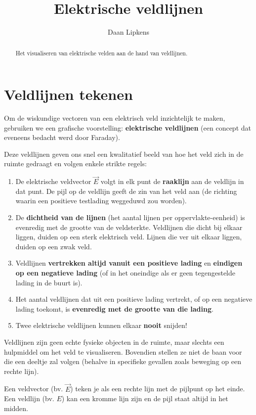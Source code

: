 \documentclass{ximera}
\title{Elektrische veldlijnen}
\author{Daan Lipkens}
\begin{document}
\begin{abstract}
    Het visualiseren van elektrische velden aan de hand van veldlijnen.
\end{abstract}
\maketitle

\section{Veldlijnen tekenen}

Om de wiskundige vectoren van een elektrisch veld inzichtelijk te maken, gebruiken we een grafische voorstelling: \textbf{elektrische veldlijnen} (een concept dat eveneens bedacht werd door Faraday).

Deze veldlijnen geven ons snel een kwalitatief beeld van hoe het veld zich in de ruimte gedraagt en volgen enkele strikte regels:

\begin{proposition}[foldable=true,title={Regels voor elektrische veldlijnen}]\nl
    \begin{enumerate}
        \item De elektrische veldvector $\vec{E}$ volgt in elk punt de \textbf{raaklijn} aan de veldlijn in dat punt. De pijl op de veldlijn geeft de zin van het veld aan (de richting waarin een positieve testlading weggeduwd zou worden).
        \item De \textbf{dichtheid van de lijnen} (het aantal lijnen per oppervlakte-eenheid) is evenredig met de grootte van de veldsterkte. Veldlijnen die dicht bij elkaar liggen, duiden op een sterk elektrisch veld. Lijnen die ver uit elkaar liggen, duiden op een zwak veld.
        \item Veldlijnen \textbf{vertrekken altijd vanuit een positieve lading} en \textbf{eindigen op een negatieve lading} (of in het oneindige als er geen tegengestelde lading in de buurt is).
        \item Het aantal veldlijnen dat uit een positieve lading vertrekt, of op een negatieve lading toekomt, is \textbf{evenredig met de grootte van die lading}.
        \item Twee elektrische veldlijnen kunnen elkaar \textbf{nooit} snijden!
    \end{enumerate}
\end{proposition}

\begin{remark}[foldable=true]
    Veldlijnen zijn geen echte fysieke objecten in de ruimte, maar slechts een hulpmiddel om het veld te visualiseren. Bovendien stellen ze niet de baan voor die een deeltje zal volgen (behalve in specifieke gevallen zoals beweging op een rechte lijn).
\end{remark}

\begin{remark}[expandable=true, title={Verschil in tekenen tussen vector en veldlijn}]\nl
    Een veldvector (bv. $\vec{E}$) teken je als een rechte lijn met de pijlpunt op het einde. Een veldlijn (bv. $E$) kan een kromme lijn zijn en de pijl staat altijd in het midden.
\end{remark}
\end{document}
